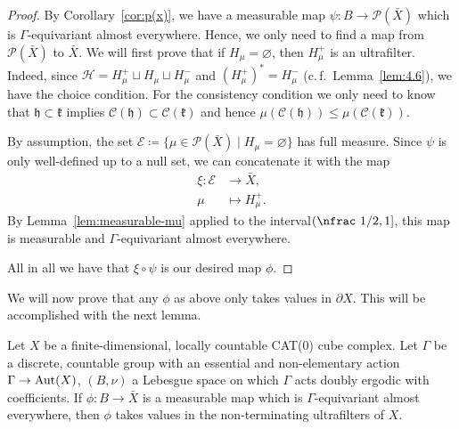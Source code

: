 \begin{proof}
  By Corollary~\ref{cor:p(x)}, we have a measurable map \(\psi\colon B \to \mathcal{P}(\bar X)\) which is \(\Gamma\)-equi\-variant almost everywhere. Hence, we only need to find a map from \(\mathcal{P}(\bar X)\) to \(\bar X\). We will first prove that if \(H_\mu = \varnothing\), then \(H_\mu^+\) is an ultrafilter. Indeed, since \(\mathcal{H} = H_\mu^+ \sqcup H_\mu \sqcup H_\mu^-\) and \((H_\mu^+)^\ast = H_\mu^-\) (c.\,f.~Lemma~\ref{lem:4.6}), we have the choice condition. For the consistency condition we only need to know that \(\mathfrak{h} \subset \mathfrak{k}\) implies \(\mathcal{C}(\mathfrak{h}) \subset \mathcal{C}(\mathfrak{k})\) and hence \(\mu(\mathcal{C}(\mathfrak{h}))\leq \mu(\mathcal{C}(\mathfrak{k}))\).

  By assumption, the set \(\mathcal{E} \coloneqq \{\mu \in \mathcal{P}(\bar X) \mid H_\mu = \varnothing\}\) has full measure. Since \(\psi\) is only well-defined up to a null set, we can concatenate it with the map
  \begin{align*}
    \xi\colon \mathcal{E} &\to \bar X,\\
    \mu &\mapsto H_\mu^+.
  \end{align*}
  By Lemma~\ref{lem:measurable-mu} applied to the interval\({(\text{\nfrac 1/2}, 1]}\), this map is measurable and \(\Gamma\)-equivariant almost everywhere.

  All in all we have that \(\xi \circ \psi\) is our desired map \(\phi\).
\end{proof}

We will now prove that any \(\phi\) as above only takes values in \(\partial X\). This will be accomplished with the next lemma.

\begin{lemma}[{\cite[Lemma~4.11]{MR3509968}}]
  \label{lem:4.11}
  Let \(X\) be a finite-dimensional, locally countable CAT(0) cube complex. Let  \(\Gamma\) be a discrete, countable group with an essential and non-elementary action \(\Gamma \to \operatorname{Aut}(X)\), \((B, \nu)\) a Lebesgue space on which \(\Gamma\) acts doubly ergodic with coefficients. If \(\phi\colon B \to \bar X\) is a measurable map which is \(\Gamma\)-equivariant almost everywhere, then \(\phi\) takes values in the non-terminating ultrafilters of \(X\).
\end{lemma}

